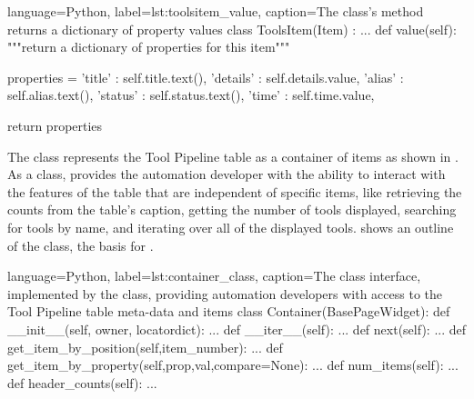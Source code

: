 \begin{xcode}{%
  language=Python,%
  label=lst:toolsitem_value,%
  caption={The  class's  method returns %
           a dictionary of property values}%
}
class ToolsItem(Item) :
    ...
    def value(self):
        """return a dictionary of properties for this item"""

        properties = {
            'title'     : self.title.text(),
            'details'   : self.details.value,
            'alias'     : self.alias.text(),
            'status'    : self.status.text(),
            'time'      : self.time.value,
        }

        return properties
\end{xcode}



The  class represents the Tool Pipeline table as a container
of items as shown in .
As a  class,  provides the automation
developer with the ability to interact with the features of the table that are
independent of specific items, like retrieving the counts from the table's
caption, getting the number of tools displayed, searching for tools by name,
and iterating over all of the displayed tools.
 shows an outline of the  class,
the basis for .

\begin{xcode}{%
  language=Python,%
  label=lst:container_class,%
  caption={The  class interface, implemented by the %
            class, providing automation developers %
           with access to the Tool Pipeline table meta-data and items}%
}
class Container(BasePageWidget):
    def __init__(self, owner, locatordict):
        ...
    def __iter__(self):
        ...
    def next(self):
        ...
    def get_item_by_position(self,item_number):
        ...
    def get_item_by_property(self,prop,val,compare=None):
        ...
    def num_items(self):
        ...
    def header_counts(self):
        ...
\end{xcode}

